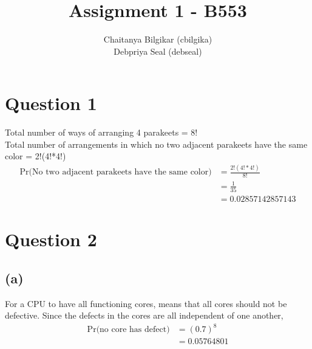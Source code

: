 \documentclass[11pt]{article}
\begin{document}
\title{Assignment 1 - B553}
\author{Chaitanya Bilgikar (cbilgika)\\
		Debpriya Seal (debseal)}
\maketitle
\section*{Question 1}
Total number of ways of arranging 4 parakeets = 8!\\
Total number of arrangements in which no two adjacent parakeets have the same color = 2!(4!*4!)\\
\begin{equation*}
\begin{split}
\text{Pr(No two adjacent parakeets have the same color)} &= \frac{2!(4!*4!)}{8!}\\
&=\frac{1}{35}\\
&=0.02857142857143
\end{split}
\end{equation*}
\section*{Question 2}
\subsection*{(a)}
For a CPU to have all functioning cores, means that all cores should not be defective. Since the defects in the cores are all independent of one another,
\begin{equation*}
\begin{split}
\text{Pr(no core has defect)} & = (0.7)^8\\
&=0.05764801
\end{split}
\end{equation*}
\end{document}

